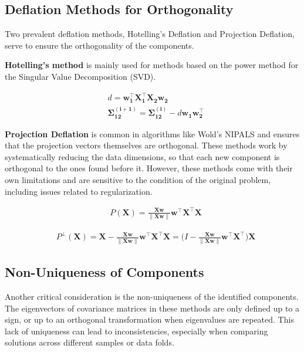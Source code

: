 \subsection{Deflation Methods for Orthogonality}

Two prevalent deflation methods, Hotelling's Deflation and Projection Deflation, serve to ensure the orthogonality of the components.

\textbf{Hotelling's method}  is mainly used for methods based on the power method for the Singular Value
Decomposition (SVD).

\begin{align}
     & d = \mathbf{w^{\top}_1X^{\top}_1X_2w_2}                                            \\
     & \mathbf{\Sigma^{(i+1)}_{12}}= \mathbf{\Sigma^{(i)}_{12}} - d\mathbf{w_1w^{\top}_2}
\end{align}

\textbf{Projection Deflation} is common in algorithms like Wold's NIPALS and ensures that the projection vectors
themselves are orthogonal. These methods work by systematically reducing the data dimensions, so that each new component is orthogonal to the ones found before it. However, these methods come with their own limitations and are sensitive to the condition of the original problem, including issues related to regularization.

\begin{align}
     & P(\mathbf{X})= \frac{\mathbf{Xw}}{\|\mathbf{Xw}\|}\mathbf{w^{\top}X^{\top}X}
\end{align}

\begin{align}
     & P^\perp(\mathbf{X})= \mathbf{X} - \frac{\mathbf{Xw}}{\|\mathbf{Xw}\|}\mathbf{w^{\top}X^{\top}X} = (I - \frac{\mathbf{Xw}}{\|\mathbf{Xw}\|}\mathbf{w^{\top}X^{\top})X}
\end{align}

\subsection{Non-Uniqueness of Components}

Another critical consideration is the non-uniqueness of the identified components.
The eigenvectors of covariance matrices in these methods are only defined up to a sign, or up to an orthogonal transformation when eigenvalues are repeated. This lack of uniqueness can lead to inconsistencies, especially when comparing solutions across different samples or data folds.

